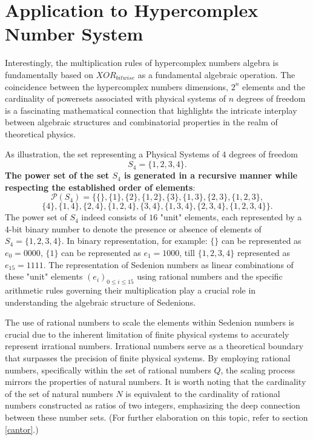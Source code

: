 \documentclass{article}
\begin{document}
\section{ Application to Hypercomplex Number System }

Interestingly, the multiplication rules of hypercomplex numbers algebra is fundamentally based on $XOR_{bitwise}$ as a fundamental algebraic operation. 
The coincidence between the hypercomplex numbers dimensions, $2^n$ elements  and the cardinality of powersets associated with physical systems
of $n$ degrees of freedom is a fascinating mathematical connection that highlights the intricate interplay between algebraic structures and 
combinatorial properties in the realm of theoretical physics.

As illustration, the set representing a Physical Systems of $4$ degrees of freedom
$$
S_4 = \{ 1 ,2,3,4\}.
$$
{\bf The power set of the set $S_4$ is generated in a recursive manner while respecting the established order of elements}:
$$
\mathcal{P}(S_4) =
\{\{\}, \{1\}, \{2\}, \{1, 2\}, \{3\}, \{1, 3\}, \{2, 3\}, \{1, 2, 3\}, 
$$
$$
\{4\}, \{1, 4\}, \{2, 4\}, \{1, 2, 4\}, \{3, 4\}, \{1, 3, 4\}, \{2, 3, 4\}, \{1, 2, 3, 4\}\}.
$$
The power set of $S_4$ indeed consists of $16$ "unit" elements, each represented by a 4-bit binary number to denote the presence or absence of elements of $
S_{4} = \{ 1 ,2,3,4  \}$. In binary representation, for example: $\{\}$ can be represented as $e_{0}=0000$, $\{1\}$ can be represented as $e_{1}=1000$, 
till $\{1, 2, 3, 4\}$ represented as $e_{15}=1111$. The representation of Sedenion numbers as linear combinations of these "unit" elements $(e_{i})_{0 \leq i \leq 15}$ using rational numbers and the 
specific arithmetic rules governing their multiplication play a crucial role in understanding the algebraic structure of Sedenions. 

The use of rational numbers to scale the elements within Sedenion numbers is crucial due to the inherent limitation of finite physical systems to accurately represent irrational numbers. Irrational numbers serve as a theoretical boundary that surpasses the precision of finite physical systems. By employing rational numbers, specifically within the set of rational numbers $Q$, the scaling process mirrors the properties of natural numbers. It is worth noting that the cardinality of the set of natural numbers $N$ is equivalent to the cardinality of rational numbers constructed as ratios of two integers, emphasizing the deep connection between these number sets. (For further elaboration on this topic, refer to section \ref{cantor}.) 
\end{document}
